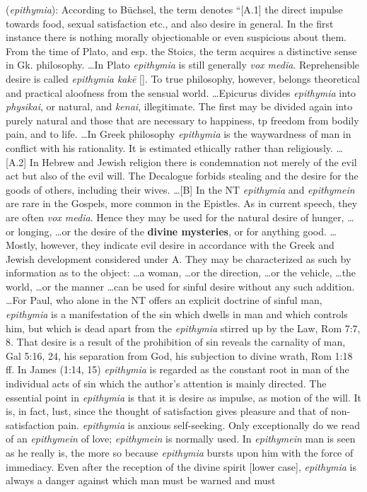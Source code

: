 \item[Craving,]

(\textit{epithymia}):
According to Büchsel, the term denotes ``[A.1] the direct impulse towards food, sexual satisfaction etc., and also desire in general. In the first instance there is nothing morally objectionable or even suspicious about them. From the time of Plato, and esp. the Stoics, the term acquires a distinctive sense in Gk. philosophy. \ldots In Plato \emph{epithymia} is still generally \emph{vox media}. Reprehensible desire is called \emph{epithymia kakē} []. To true philosophy, however, belongs theoretical and practical aloofness from the sensual world. \ldots Epicurus divides \emph{epithymia} into \emph{physikai}, or natural, and \emph{kenai}, illegitimate. The first may be divided again into purely natural and those that are necessary to happiness, tp freedom from bodily pain, and to life. \ldots In Greek philosophy \emph{epithymia} is the waywardness of man in conflict with his rationality. It is estimated ethically rather than religiously. \ldots [A.2] In Hebrew and Jewish religion there is condemnation not merely of the evil act but also of the evil will. The Decalogue forbids stealing and the desire for the goods of others, including their wives. \ldots [B] In the NT \emph{epithymia} and \emph{epithymein} are rare in the Gospels, more common in the Epistles. As in current speech, they are often \emph{vox media}. Hence they may be used for the natural desire of hunger, \ldots or longing, \ldots or the desire of the \textbf{divine mysteries}, or for anything good. \ldots Mostly, however, they indicate evil desire in accordance with the Greek and Jewish development considered under A. They may be characterized  as such by information as to the object: \ldots a woman, \ldots or the direction, \ldots or the vehicle, \ldots the world, \ldots or the manner \ldots can be used for sinful desire without any such addition. \ldots For Paul, who alone in the NT offers an explicit doctrine of sinful man, \emph{epithymia} is a manifestation of the sin which  dwells in man and which controls him, but which is dead apart from the \emph{epithymia} stirred up by the Law, Rom 7:7, 8. That desire is a result of the prohibition of sin reveals the carnality of man, Gal 5:16, 24, his separation from God, his subjection to divine wrath, Rom 1:18 ff. In James (1:14, 15) \emph{epithymia} is regarded as the constant root in man of the individual acts of sin which the author's attention is mainly directed. The essential point in \emph{epithymia} is that it is desire as impulse, as motion of the will. It is, in fact, lust, since the thought of satisfaction gives pleasure and that of non-satisfaction pain. \emph{epithymia} is anxious self-seeking. Only exceptionally do we read of an \emph{epithymein} of love; \emph{epithymein} is normally used. In \emph{epithymein} man is seen as he really is, the more so because \emph{epithymia} bursts upon him with the force of immediacy. Even after the reception of the divine spirit [lower case], \emph{epithymia} is always a danger against which man must be warned and must 